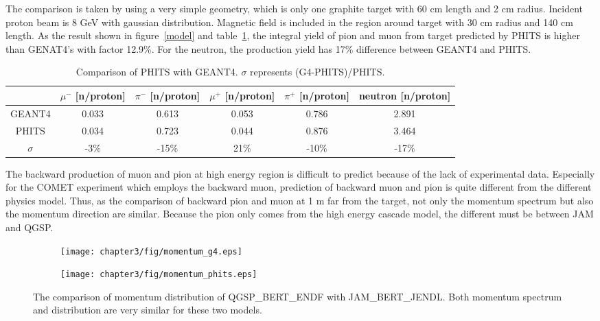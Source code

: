 The comparison is taken by using a very simple geometry, which is only one graphite target with 60 cm length and 2 cm radius.
Incident proton beam is 8 GeV with gaussian distribution.
Magnetic field is included in the region around target with 30 cm radius and 140 cm length.
As the result shown in figure~\ref{model} and table~\ref{2model}, the integral yield of pion and muon from target predicted by PHITS is higher than GENAT4's with factor 12.9\%.
For the neutron, the production yield has 17\% difference between GEANT4 and PHITS.
\begin{table}[H]
 \centering
 \begin{tabular}{cccccc} \hline \hline
  & $\mu^-$ [n/proton] & $\pi^-$ [n/proton] & $\mu^+$ [n/proton] & $\pi^+$ [n/proton] & neutron [n/proton] \\ \hline
  GEANT4 & 0.033 & 0.613 & 0.053 & 0.786 & 2.891 \\
  PHITS & 0.034 & 0.723 & 0.044 & 0.876 & 3.464 \\ \hline
  $\sigma$ & -3\% & -15\% & 21\% & -10\% & -17\% \\ \hline \hline
 \end{tabular}
 \caption{Comparison of PHITS with GEANT4. $\sigma$ represents (G4-PHITS)/PHITS.}
 \label{2model}
\end{table}
The backward production of muon and pion at high energy region is difficult to predict because of the lack of experimental data.
Especially for the COMET experiment which employs the backward muon, prediction of backward muon and pion is quite different from the different physics model.
Thus, as the comparison of backward pion and muon at 1 m far from the target, not only the momentum spectrum but also the momentum direction are similar.
Because the pion only comes from the high energy cascade model, the different must be between JAM and QGSP.
\begin{figure}[H]
 \begin{subfigure}{0.3\textwidth}
  \centering
  \texttt{[image: chapter3/fig/momentum\_g4.eps]}
 \end{subfigure}
 \hspace{0.2\textwidth}
 \begin{subfigure}{0.3\textwidth}
  \centering
  \texttt{[image: chapter3/fig/momentum\_phits.eps]}
 \end{subfigure}
 \caption{The comparison of momentum distribution of QGSP\_BERT\_ENDF with JAM\_BERT\_JENDL. Both momentum spectrum and distribution are very similar for these two models.}
 \label{mom}
\end{figure}
